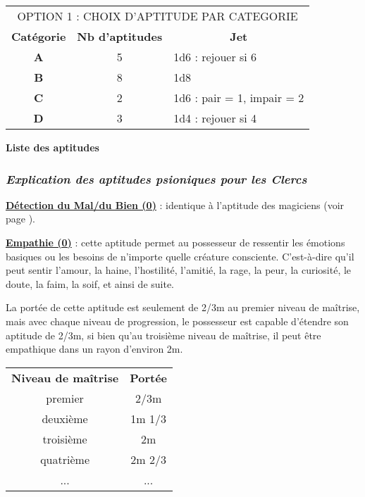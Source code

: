 \bigskip

\begin{tabular}{ccl}
\multicolumn{3}{c}{OPTION 1 : CHOIX D'APTITUDE PAR CATEGORIE} \\
\textbf{Catégorie} &  \textbf{Nb d'aptitudes} & \multicolumn{1}{c}{\textbf{Jet}} \\
\textbf{A} & 5 & 1d6 : rejouer si 6 \\
\textbf{B} & 8 & 1d8 \\
\textbf{C} & 2 & 1d6 : pair = 1, impair = 2 \\
\textbf{D} & 3 & 1d4 : rejouer si 4 \\
\end{tabular}

\bigskip

\textbf{Liste des aptitudes}

\bigskip


\subsubsection*{\textit{Explication des aptitudes psioniques pour les Clercs}}

\textbf{\uline{Détection du Mal/du Bien (0)}} : identique à l'aptitude des magiciens (voir page \pageref{magicien-detection-mal}).

\bigskip

\label{clerc-empathie}\textbf{\uline{Empathie (0)}} : cette aptitude permet au possesseur de ressentir les émotions basiques ou les besoins de n'importe quelle créature consciente. C'est-à-dire qu'il peut sentir l'amour, la haine, l'hostilité, l'amitié, la rage, la peur, la curiosité, le doute, la faim, la soif, et ainsi de suite.

\bigskip

La portée de cette aptitude est seulement de 2/3m au premier niveau de maîtrise, mais avec chaque niveau de progression, le possesseur est capable d'étendre son aptitude de 2/3m, si bien qu'au troisième niveau de maîtrise, il peut être empathique dans un rayon d'environ 2m.

\bigskip

\begin{tabular}{cc}
\textbf{Niveau de maîtrise} & \textbf{Portée}\\
premier     & 2/3m   \\
deuxième    & 1m 1/3   \\
troisième   & 2m  \\
quatrième   & 2m 2/3 \\
...         & ...    \\
\end{tabular}

